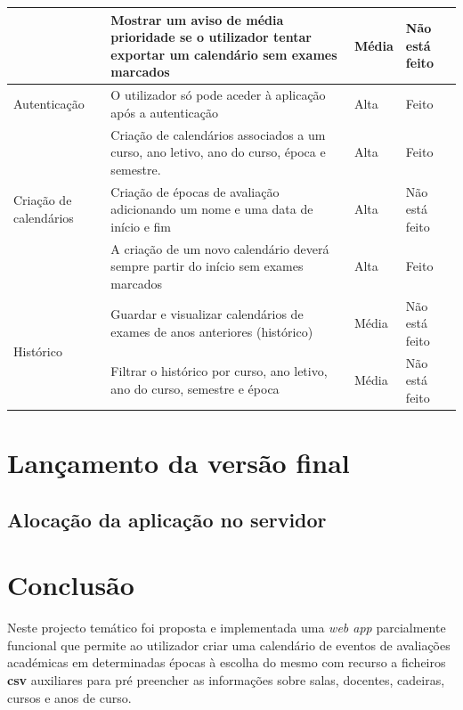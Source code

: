 \documentclass[11pt, twoside]{report}
\begin{document}
\begin{center}
\begin{longtable}{|m{2.2cm}|m{10cm}|m{2cm}|m{2cm}|}
			
			& Mostrar um aviso de média prioridade se o utilizador tentar exportar um calendário sem exames marcados & Média& Não está feito\\
			\hline
			
			Autenticação& O utilizador só pode aceder à aplicação após a autenticação & Alta & Feito\\
			\hline
			
			\multirow{3}{2cm}{Criação de calendários}&Criação de calendários associados a um curso, ano letivo, ano do curso, época e semestre.& Alta & Feito\\
			
			& Criação de épocas de avaliação adicionando um nome e uma data de início e fim & Alta & Não está feito\\
			
			& A criação de um novo calendário deverá sempre partir do início sem exames marcados & Alta & Feito\\
			\hline
			\multirow{2}{*}{Histórico}& Guardar e visualizar calendários de exames de anos anteriores (histórico)& Média &Não está feito \\
			
			& Filtrar o histórico por curso, ano letivo, ano do curso, semestre e época& Média &Não está feito\\
			\hline
		\end{longtable}
	\end{center}
	
	
	\chapter{Lançamento da versão final}
	\section{Alocação da aplicação no servidor}
	
	
	\chapter{Conclusão}
	
	Neste projecto temático foi proposta e implementada uma \textit{web app} parcialmente funcional que permite ao utilizador criar uma calendário de eventos de avaliações académicas em determinadas épocas à escolha do mesmo com recurso a ficheiros \textbf{csv} auxiliares para pré preencher as informações sobre salas, docentes, cadeiras, cursos e anos de curso.
	
\end{document}
